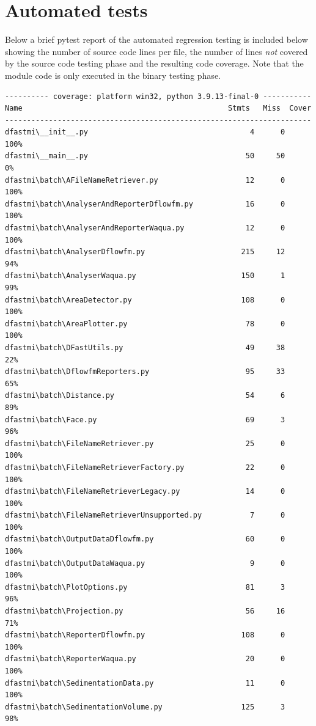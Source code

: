 \section{Automated tests}

Below a brief pytest report of the automated regression testing is included below showing the number of source code lines per file, the number of lines \emph{not} covered by the source code testing phase and the resulting code coverage.
Note that the  module code is only executed in the binary testing phase.

\begin{Verbatim}
---------- coverage: platform win32, python 3.9.13-final-0 -----------
Name                                               Stmts   Miss  Cover
----------------------------------------------------------------------
dfastmi\__init__.py                                     4      0   100%
dfastmi\__main__.py                                    50     50     0%
dfastmi\batch\AFileNameRetriever.py                    12      0   100%
dfastmi\batch\AnalyserAndReporterDflowfm.py            16      0   100%
dfastmi\batch\AnalyserAndReporterWaqua.py              12      0   100%
dfastmi\batch\AnalyserDflowfm.py                      215     12    94%
dfastmi\batch\AnalyserWaqua.py                        150      1    99%
dfastmi\batch\AreaDetector.py                         108      0   100%
dfastmi\batch\AreaPlotter.py                           78      0   100%
dfastmi\batch\DFastUtils.py                            49     38    22%
dfastmi\batch\DflowfmReporters.py                      95     33    65%
dfastmi\batch\Distance.py                              54      6    89%
dfastmi\batch\Face.py                                  69      3    96%
dfastmi\batch\FileNameRetriever.py                     25      0   100%
dfastmi\batch\FileNameRetrieverFactory.py              22      0   100%
dfastmi\batch\FileNameRetrieverLegacy.py               14      0   100%
dfastmi\batch\FileNameRetrieverUnsupported.py           7      0   100%
dfastmi\batch\OutputDataDflowfm.py                     60      0   100%
dfastmi\batch\OutputDataWaqua.py                        9      0   100%
dfastmi\batch\PlotOptions.py                           81      3    96%
dfastmi\batch\Projection.py                            56     16    71%
dfastmi\batch\ReporterDflowfm.py                      108      0   100%
dfastmi\batch\ReporterWaqua.py                         20      0   100%
dfastmi\batch\SedimentationData.py                     11      0   100%
dfastmi\batch\SedimentationVolume.py                  125      3    98%

\end{Verbatim}
